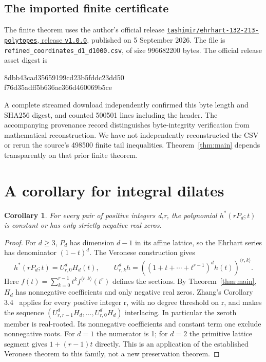 \documentclass[11pt]{article}
\newtheorem{corollary}[theorem]{Corollary}
\theoremstyle{remark}\newtheorem{remark}[theorem]{Remark}
\begin{document}
\subsection{The imported finite certificate}
The finite theorem uses the author's official release
\href{https://github.com/tashimir/ehrhart-132-213-polytopes/releases/tag/v1.0.0}
{\texttt{tashimir/ehrhart-132-213-polytopes}, release \texttt{v1.0.0}},
published on 5 September 2026. The file is
\texttt{refined\_coordinates\_d1\_d1000.csv}, of size 996682200 bytes.
The official release asset digest is
\begin{center}\small\ttfamily
8dbb43cad35659199cd23b5fddc23dd50\\
f76d35adff5b636ac366d460069b5ce
\end{center}
A complete streamed download independently confirmed this byte length and SHA256
digest, and counted 500501 lines including the header. The accompanying
provenance record distinguishes byte-integrity verification from mathematical
reconstruction. We have not independently
reconstructed the CSV or rerun the source's 498500 finite tail inequalities.
Theorem~\ref{thm:main} depends transparently on that prior finite theorem.

\section{A corollary for integral dilates}\label{sec:dilates}
\begin{corollary}\label{cor:dilates}
For every pair of positive integers d,r, the polynomial $h^*(rP_d;t)$ is
constant or has only strictly negative real zeros.
\end{corollary}
\begin{proof}
For $d\ge3$, $P_d$ has dimension $d-1$ in its affine lattice, so the Ehrhart
series has denominator $(1-t)^d$. The Veronese construction gives
\[
 h^*(rP_d;t)=U^d_{r,0}H_d(t),\qquad
 U^d_{r,k}h=\left((1+t+\cdots+t^{r-1})^dh(t)\right)^{\langle r,k\rangle}.
\]
Here $f(t)=\sum_{k=0}^{r-1}t^kf^{\langle r,k\rangle}(t^r)$ defines the
sections. By Theorem~\ref{thm:main}, $H_d$ has nonnegative coefficients and
only negative real zeros. Zhang's Corollary 3.4~\cite[p.~7]{zhang} applies
for every positive integer r, with no degree threshold on r, and makes
the sequence $(U^d_{r,r-1}H_d,\ldots,U^d_{r,0}H_d)$ interlacing.
In particular the zeroth member is real-rooted. Its nonnegative coefficients
and constant term one exclude nonnegative roots.
For $d=1$ the numerator is 1; for $d=2$ the primitive lattice segment
gives $1+(r-1)t$ directly. This is an application of the established Veronese
theorem to this family, not a new preservation theorem.
\end{proof}
\end{document}
